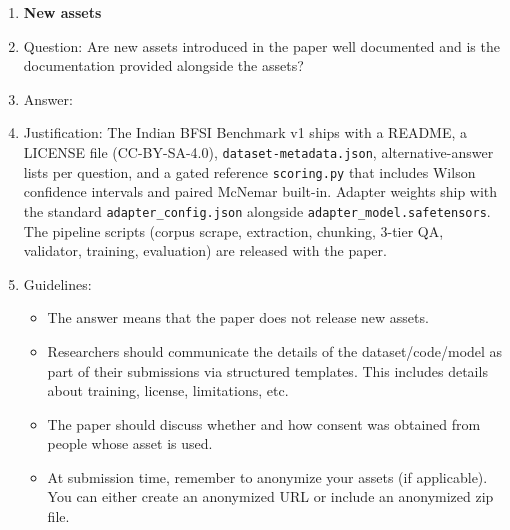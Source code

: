 \begin{enumerate}
\item {\bf New assets}
    \item[] Question: Are new assets introduced in the paper well documented and is the documentation provided alongside the assets?
    \item[] Answer: \answerYes{}
    \item[] Justification: The Indian BFSI Benchmark v1 ships with a README, a LICENSE file (CC-BY-SA-4.0), \texttt{dataset-metadata.json}, alternative-answer lists per question, and a gated reference \texttt{scoring.py} that includes Wilson confidence intervals and paired McNemar built-in. Adapter weights ship with the standard \texttt{adapter\_config.json} alongside \texttt{adapter\_model.safetensors}. The pipeline scripts (corpus scrape, extraction, chunking, 3-tier QA, validator, training, evaluation) are released with the paper.
    \item[] Guidelines:
    \begin{itemize}
        \item The answer \answerNA{} means that the paper does not release new assets.
        \item Researchers should communicate the details of the dataset\slash code\slash model as part of their submissions via structured templates. This includes details about training, license, limitations, etc.
        \item The paper should discuss whether and how consent was obtained from people whose asset is used.
        \item At submission time, remember to anonymize your assets (if applicable). You can either create an anonymized URL or include an anonymized zip file.
    \end{itemize}


\end{enumerate}
